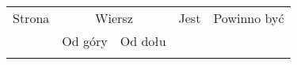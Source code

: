 \documentclass[a4paper,11pt]{article}
\numberwithin{equation}{section}
\begin{document}
\begin{center}

  \begin{tabular}{|c|c|c|c|c|}
    \hline
    Strona & \multicolumn{2}{c|}{Wiersz} & Jest
                              & Powinno być \\ \cline{2-3}
    & Od góry & Od dołu & & \\
    \hline
    & & & & \\
    \hline
  \end{tabular}






\end{center}
\end{document}
